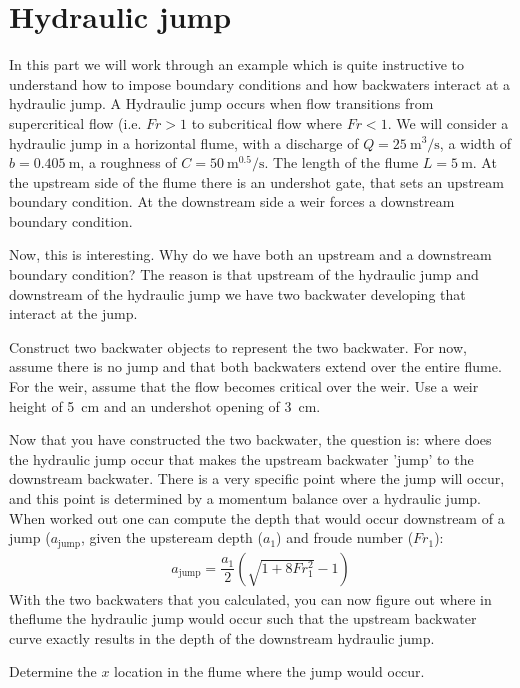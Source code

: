 \documentclass[a4paper]{article}
\begin{document}
\section{Hydraulic jump}
In this part we will work through an example which is quite instructive to understand how to impose boundary conditions and how backwaters interact at a hydraulic jump. A Hydraulic jump occurs when flow transitions from supercritical flow (i.e. $Fr>1$ to subcritical flow where $Fr<1$. 
We will consider a hydraulic jump in a horizontal flume, with a discharge of $Q=\SI{25}{\cubic\m\per\s}$, a width of $b=\SI{0.405}{\m}$, a roughness of $C=\SI{50}{\m\tothe{0.5}\per\s}$. The length of the flume $L=\SI{5}{\m}$. At the upstream side of the flume there is an undershot gate, that sets an upstream boundary condition. At the downstream side a weir forces a downstream boundary condition.

Now, this is interesting. Why do we have both an upstream and a downstream boundary condition? The reason is that upstream of the hydraulic jump and downstream of the hydraulic jump we have two backwater developing that interact at the jump. 

\begin{exercise}
  Construct two backwater objects to represent the two backwater. For now, assume there is no jump and that both backwaters extend over the entire flume. For the weir, assume that the flow becomes critical over the weir. Use a weir height of \SI{5}{\cm} and an undershot opening of \SI{3}{\cm}.
\end{exercise}

Now that you have constructed the two backwater, the question is: where does the hydraulic jump occur that makes the upstream backwater 'jump' to the downstream backwater. There is a very specific point where the jump will occur, and this point is determined by a momentum balance over a hydraulic jump. When worked out one can compute the depth  that would occur downstream of a jump ($a_\text{jump}$, given the upsteream depth ($a_1$) and froude number ($Fr_1$):
\begin{align*}
  a_\text{jump}=\dfrac{a_1}{2}(\sqrt{1+8Fr_1^2}-1)
\end{align*}
With the two backwaters that you calculated, you can now figure out where in theflume the hydraulic jump would occur such that the upstream backwater curve exactly results in the depth of the downstream hydraulic jump.

\begin{exercise}
  Determine the $x$ location in the flume where the jump would occur.
\end{exercise}
\end{document}
